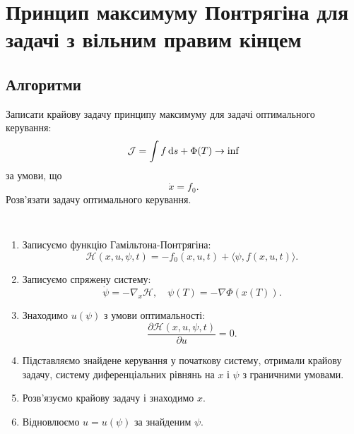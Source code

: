 \section{Принцип максимуму Понтрягіна для задачі з вільним правим кінцем}

\subsection{Алгоритми}

\begin{problem*}
    Записати крайову задачу принципу максимуму для задачі оптимального керування: \[ \mathcal{J} = \int f \mathop{}\!\mathrm{d} s + \Phi(T) \to \inf \] за умови, що \[ \dot x = f_0. \] Розв'язати задачу оптимального керування.
\end{problem*}

\begin{algorithm} \tt
    \begin{enumerate}
        \item Записуємо функцію Гамільтона-Понтрягіна: \[ \mathcal{H} (x, u, \psi, t) = - f_0(x, u, t) + \langle \psi, f(x, u, t) \rangle. \]
    
        \item Записуємо спряжену систему: \[ \dot \psi = - \nabla_x \mathcal{H}, \quad \psi(T) = - \nabla \Phi(x(T)). \]
    
    
        \item Знаходимо $u(\psi)$ з умови оптимальності: \[ \dfrac{\partial \mathcal{H}(x, u, \psi, t)}{\partial u} = 0. \]

        \item Підставляємо знайдене керування у початкову систему, от\-ри\-ма\-ли \allowbreak край\-о\-ву задачу, систему диференціальних рівнянь на $x$ і $\psi$ з гра\-нич\-ни\-ми  \allowbreak у\-мо\-ва\-ми.

        \item Розв'язуємо крайову задачу і знаходимо $x$.

        \item Відновлюємо $u = u (\psi)$ за знайденим $\psi$.
    \end{enumerate}
\end{algorithm}
